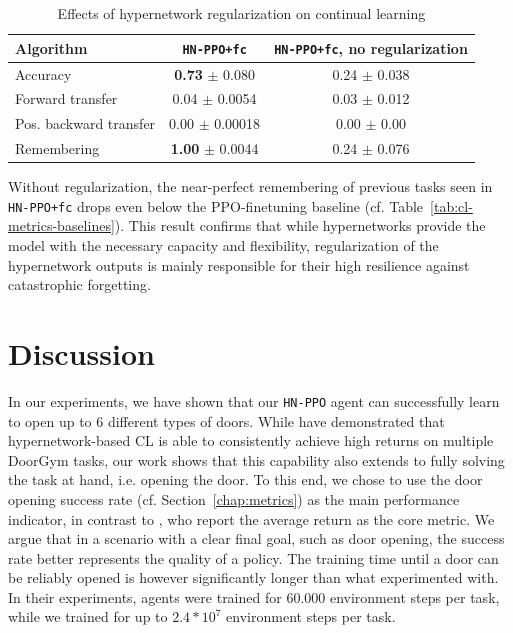 \documentclass[dvipsnames]{article} %
\newcommand{\commentOLD}[1]{}
\newcommand{\asOLD}[1] {\commentOLD{{\color{orange} AS: #1}}}              %
\begin{document}
\begin{table}[tb]
\caption{Effects of hypernetwork regularization on continual learning}
\label{tab:ablation-results}
\begin{center}
\begin{tabular}{@{}lcc@{}}
\toprule
Algorithm & \texttt{HN-PPO+fc} & \texttt{HN-PPO+fc}, no regularization \\ 
\midrule
Accuracy               &  \textbf{0.73} $\pm$ 0.080 & 0.24 $\pm$ 0.038\\
Forward transfer       &  0.04 $\pm$ 0.0054 & 0.03 $\pm$ 0.012\\
Pos. backward transfer &  0.00 $\pm$ 0.00018& 0.00 $\pm$ 0.00\\
Remembering            &  \textbf{1.00} $\pm$ 0.0044& 0.24 $\pm$ 0.076\\
\bottomrule
\end{tabular}
\end{center}
\end{table}

Without regularization, the near-perfect remembering of previous tasks seen in \texttt{HN-PPO+fc} drops even below the PPO-finetuning baseline (cf. Table~\ref{tab:cl-metrics-baselines}). This result confirms that while hypernetworks provide the model with the necessary capacity and flexibility, regularization of the hypernetwork outputs is mainly responsible for their high resilience against catastrophic forgetting.

\section{Discussion}
\asOLD{Start with summarizing what you did, this paragraph comes as too abrupt.} 
In our experiments, we have shown that our \texttt{HN-PPO} agent can successfully learn to open up to 6 different types of doors. While \citet{MBRLHypernetworks} have demonstrated that hypernetwork-based CL is able to consistently achieve high returns on multiple DoorGym tasks, our work shows that this capability also extends to fully solving the task at hand, i.e. opening the door. To this end, we chose to use the door opening success rate (cf. Section~\ref{chap:metrics}) as the main performance indicator, in contrast to \citet{MBRLHypernetworks}, who report the average return as the core metric. We argue that in a scenario with a clear final goal, such as door opening, the success rate better represents the quality of a policy. The training time until a door can be reliably opened is however significantly longer than what \citet{MBRLHypernetworks} experimented with. In their experiments, agents were trained for 60.000 environment steps per task, while we trained for up to $2.4*10^7$ environment steps per task. 
\end{document}
